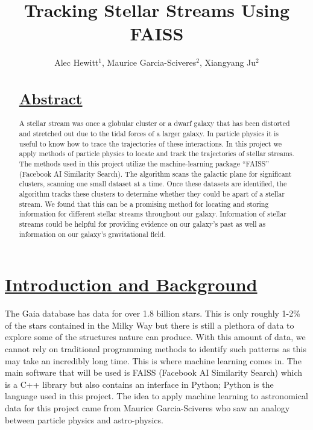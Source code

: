 \documentclass[notitlepage,nofootinbib,preprintnumbers,aps,prd]{revtex4-1}
\begin{document}
\title{Tracking Stellar Streams Using FAISS}

\author{Alec Hewitt$^1$, Maurice Garcia-Sciveres$^2$, Xiangyang Ju$^2$}

\begin{abstract}
\section*{\underline{Abstract}}
\indent A stellar stream was once a globular cluster or a dwarf galaxy that has been distorted and stretched out due to the tidal forces of a larger galaxy. In particle physics it is useful to know how to trace the trajectories of these interactions. In this project we apply methods of particle physics to locate and track the trajectories of stellar streams. The methods used in this project utilize the machine-learning package “FAISS” (Facebook AI Similarity Search). The algorithm scans the galactic plane for significant clusters, scanning one small dataset at a time. Once these datasets are identified, the algorithm tracks these clusters to determine whether they could be apart of a stellar stream. We found that this can be a promising method for locating and storing information for different stellar streams throughout our galaxy. Information of stellar streams could be helpful for providing evidence on our galaxy’s past as well  as information on our galaxy’s gravitational field.
\end{abstract}
\maketitle


\setlength\parindent{24pt}


\section{\underline{Introduction and Background}}

\indent The Gaia database has data for over 1.8 billion stars. This is only roughly 1-2\% of the stars
contained in the Milky Way but there is still a plethora of data to explore some of the structures
nature can produce. With this amount of data, we cannot rely on traditional programming methods to identify such patterns as this may take an incredibly long time. This is where machine
learning comes in. The main software that will be used is FAISS (Facebook AI Similarity
Search) which is a C++ library but also contains an interface in Python; Python is the language
used in this project. The idea to apply machine learning to astronomical data for this project
came from Maurice Garcia-Sciveres who saw an analogy between particle physics and astro-physics.\\
\end{document}
